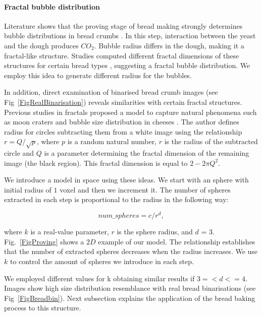 \documentclass[final,5p,times]{elsarticle}
\begin{document}
\paragraph{Fractal bubble distribution}
Literature shows that the proving stage of bread making strongly determines bubble distributions in bread crumbs \cite{Babin2006}. In this step, interaction between the yeast and the dough produces {\em $CO_{2}$}. Bubble radius differs in the dough, making it a fractal-like structure. Studies computed different fractal dimensions of these structures for certain bread types \cite{Gonzales2008} , suggesting a fractal bubble distribution. We employ this idea to generate different radius for the bubbles.

In addition, direct examination of binarised bread crumb images (see Fig~\ref{FigRealBinarisation}) reveals similarities with certain fractal structures. Previous studies in fractals proposed a model to capture natural phenomena such as moon craters and bubble size distribution in cheeses \cite{Mandelbrot1982}. The author defines radius for circles subtracting them from a white image using the relationship $r = Q/\sqrt{p}$, where $p$ is a random natural number, $r$ is the radius of the subtracted circle and $Q$ is a parameter determining the fractal dimension of the remaining image (the black region). This fractal dimension is equal to $2-2\pi Q^{2}$.

We introduce a model in space using these ideas. We start with an sphere with initial radius of $1$ voxel and then we increment it. The number of spheres extracted in each step is proportional to the radius in the following way:

\begin{equation}
num\_spheres = c/r^{d},
\end{equation}

\noindent where $k$ is a real-value parameter, $r$ is the sphere radius, and $d$ = 3. Fig.~\ref{FigProving} shows a $2D$ example of our model.  The relationship establishes that the number of extracted spheres decreases when the radius increases. We use $k$ to control the amount of spheres we introduce in each step.

We employed different values for k obtaining similar results if $3=<d<=4$. Images show high size distribution resemblance with real bread binarisations (see Fig~\ref{FigBreadbin}). Next subsection explains the application of the bread baking process to this structure.
\end{document}
